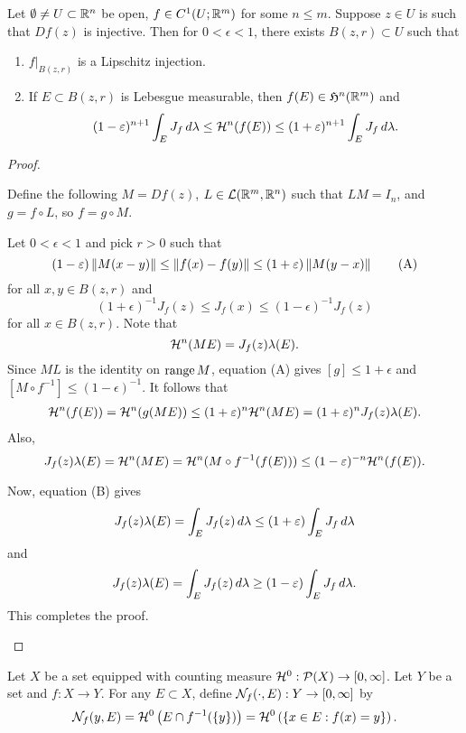 \documentclass[a4paper]{article}
\begin{document}
\begin{lemma}
Let $\emptyset \neq U \subset \mathbb{R}^n$ be open, $f \in C^1 (U ; \mathbb{R}^m)$
for some $n \leq m$. Suppose $z \in U$ is such that
$Df(z)$ is injective. Then for $0 < \epsilon < 1$, there
exists $B(z, r) \subset U$ such that
\begin{enumerate}
\item $f \vert_{B(z, r)}$ is a Lipschitz injection.
\item If $E \subset B(z, r)$ is Lebesgue measurable,
then $f(E) \in \mathfrak{H}^n (\mathbb{R}^m)$ and
\[
(1 - \varepsilon)^{n+1}
\int_E J_f \, d \lambda
\leq \mathcal{H}^n (f(E)) \leq
(1 + \varepsilon)^{n+1} \int_E J_f \, d \lambda.
\]
\end{enumerate}
\end{lemma}

\begin{proof}
\begin{enumerate}
Define the following $M = Df(z)$, $L \in \mathcal{L}(\mathbb{R}^m, \mathbb{R}^n)$
such that $L M = I_n$, and $g = f \circ L$, so $f = g \circ M$.

Let $0 < \epsilon < 1$ and pick $r > 0$ such that
\[
  (1 - \varepsilon) \left\lVert M (x - y)\right\rVert
  \leq \left\lVert f(x) - f(y)\right\rVert \leq
  (1 + \varepsilon) \left\lVert M (y - x)\right\rVert
  \tag{A}
\]
for all $x, y \in B(z, r)$
and
\[
  (1 + \epsilon)^{-1} J_f(z)
  \leq J_f(x) \leq
  (1 - \epsilon)^{-1} J_f(z)
  \tag{B}
\]
for all $x \in B(z, r)$. Note that
\[
\mathcal{H}^n (ME) = J_f(z) \lambda(E).
\]
Since $ML$ is the identity on $\operatorname{range} M$,
equation (A) gives $[g] \leq 1 + \epsilon$ and
$[M \circ f^{-1}] \leq (1 - \epsilon)^{-1}$.
It follows that
\[
\begin{aligned}
\mathcal{H}^n (f(E)) = \mathcal{H}^n(g(ME))
\leq (1 + \varepsilon)^n \mathcal{H}^n (ME)
= (1 + \varepsilon)^n J_f(z) \lambda(E).
\end{aligned}
\]
Also,
\[
J_f(z) \lambda (E) = \mathcal{H}^n (ME)
= \mathcal{H}^n (M \circ f^{-1} (f(E)))
\leq (1 - \varepsilon)^{-n} \mathcal{H}^n (f(E)).
\]

Now, equation (B) gives
\[
J_f(z) \lambda(E)
= \int_E J_f(z) \, d \lambda
\leq (1 + \varepsilon) \int_E J_f \, d \lambda
\]
and
\[
J_f(z) \lambda(E)
= \int_E J_f(z) \, d \lambda
\geq (1 - \varepsilon) \int_E J_f \, d \lambda.
\]
This completes the proof.

\end{enumerate}
\end{proof}

\begin{defi}
Let $X$ be a set equipped with counting measure
$\mathcal{H}^0 : \mathcal{P}(X) \to [0, \infty]$. Let $Y$ be a set
and $f: X \to Y$. For any $E \subset X$, define
$\mathcal{N}_f (\cdot, E) : Y \to [0, \infty]$ by
\[
\mathcal{N}_f(y, E) = \mathcal{H}^0 \left( E \cap f^{-1} (\{y\}) \right)
= \mathcal{H}^0 \left( \left\{ x \in E: f(x) = y \right\} \right).
\]
\end{defi}
\end{document}
